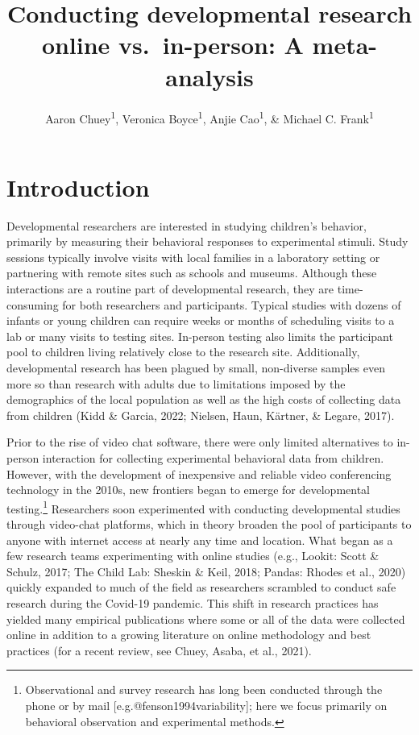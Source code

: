 \documentclass[
  man,floatsintext]{apa6}
\title{Conducting developmental research online vs.~in-person: A meta-analysis}
\author{Aaron Chuey\textsuperscript{1}, Veronica Boyce\textsuperscript{1}, Anjie Cao\textsuperscript{1}, \& Michael C. Frank\textsuperscript{1}}
\date{}
\affiliation{\vspace{0.5cm}\textsuperscript{1} Stanford University}
\begin{document}
\maketitle

\hypertarget{introduction}{%
\section{Introduction}\label{introduction}}

Developmental researchers are interested in studying children's behavior, primarily by measuring their behavioral responses to experimental stimuli. Study sessions typically involve visits with local families in a laboratory setting or partnering with remote sites such as schools and museums. Although these interactions are a routine part of developmental research, they are time-consuming for both researchers and participants. Typical studies with dozens of infants or young children can require weeks or months of scheduling visits to a lab or many visits to testing sites. In-person testing also limits the participant pool to children living relatively close to the research site. Additionally, developmental research has been plagued by small, non-diverse samples even more so than research with adults due to limitations imposed by the demographics of the local population as well as the high costs of collecting data from children (Kidd \& Garcia, 2022; Nielsen, Haun, Kärtner, \& Legare, 2017).

Prior to the rise of video chat software, there were only limited alternatives to in-person interaction for collecting experimental behavioral data from children. However, with the development of inexpensive and reliable video conferencing technology in the 2010s, new frontiers began to emerge for developmental testing.\footnote{Observational and survey research has long been conducted through the phone or by mail {[}e.g.@fenson1994variability{]}; here we focus primarily on behavioral observation and experimental methods.} Researchers soon experimented with conducting developmental studies through video-chat platforms, which in theory broaden the pool of participants to anyone with internet access at nearly any time and location. What began as a few research teams experimenting with online studies (e.g., Lookit: Scott \& Schulz, 2017; The Child Lab: Sheskin \& Keil, 2018; Pandas: Rhodes et al., 2020) quickly expanded to much of the field as researchers scrambled to conduct safe research during the Covid-19 pandemic. This shift in research practices has yielded many empirical publications where some or all of the data were collected online in addition to a growing literature on online methodology and best practices (for a recent review, see Chuey, Asaba, et al., 2021).
\end{document}
